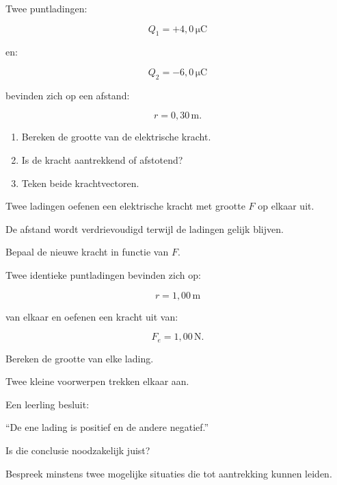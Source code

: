 \documentclass{ximera}
\begin{document}
\begin{oefening}[Coulombkracht]{\oefB\ESS}

Twee puntladingen:

\[
Q_1=+4{,}0\,\mathrm{\mu C}
\]

en:

\[
Q_2=-6{,}0\,\mathrm{\mu C}
\]

bevinden zich op een afstand:

\[
r=0{,}30\,\mathrm m.
\]

\begin{enumerate}
  \item Bereken de grootte van de elektrische kracht.
  \item Is de kracht aantrekkend of afstotend?
  \item Teken beide krachtvectoren.
\end{enumerate}

\end{oefening}


\begin{oefening}{\oefB\ESS}

Twee ladingen oefenen een elektrische kracht met grootte $F$ op elkaar
uit.

De afstand wordt verdrievoudigd terwijl de ladingen gelijk blijven.

Bepaal de nieuwe kracht in functie van $F$.

\end{oefening}


\begin{oefening}{\oefB\ESS}

Twee identieke puntladingen bevinden zich op:

\[
r=1{,}00\,\mathrm m
\]

van elkaar en oefenen een kracht uit van:

\[
F_e=1{,}00\,\mathrm N.
\]

Bereken de grootte van elke lading.

\end{oefening}





\begin{oefening}{\oefU\ESS}

Twee kleine voorwerpen trekken elkaar aan.

Een leerling besluit:

``De ene lading is positief en de andere negatief.''

Is die conclusie noodzakelijk juist?

Bespreek minstens twee mogelijke situaties die tot aantrekking kunnen
leiden.

\end{oefening}
\end{document}
